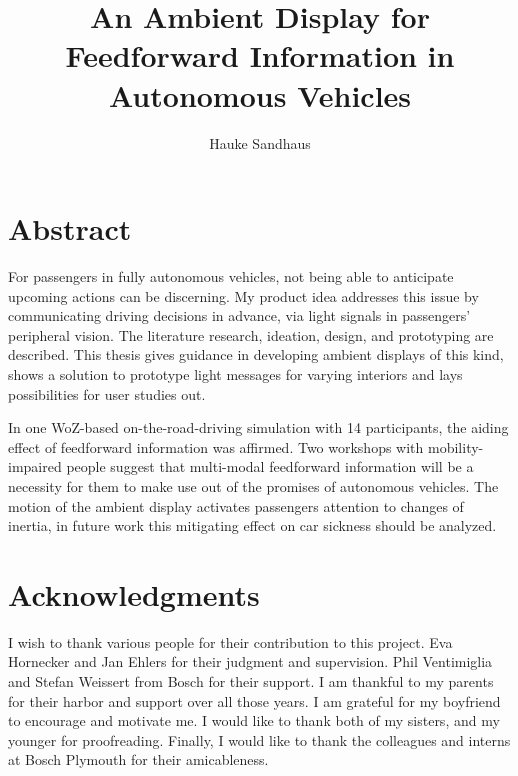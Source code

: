 \documentclass[oneside]{tutthesis} %
\author{Hauke Sandhaus}
\title{An Ambient Display for Feedforward Information in Autonomous Vehicles}
\begin{document}



\chapter*{Abstract}
\label{ch:abstract}
For passengers in fully autonomous vehicles, not being able to anticipate upcoming actions can be discerning. My product idea addresses this issue by communicating driving decisions in advance, via light signals in passengers' peripheral vision. 
The literature research, ideation, design, and prototyping are described. This thesis gives guidance in developing ambient displays of this kind, shows a solution to prototype light messages for varying interiors and lays possibilities for user studies out. 

In one WoZ-based on-the-road-driving simulation with 14 participants, the aiding effect of feedforward information was affirmed. Two workshops with mobility-impaired people suggest that multi-modal feedforward information will be a necessity for them to make use out of the promises of autonomous vehicles. The motion of the ambient display activates passengers attention to changes of inertia, in future work this mitigating effect on car sickness should be analyzed. 





\chapter*{Acknowledgments}
\label{ch:Acknowledgments}
I wish to thank various people for their contribution to this project. Eva Hornecker and Jan Ehlers for their judgment and supervision. Phil Ventimiglia and Stefan Weissert from Bosch for their support. I am thankful to my parents for their harbor and support over all those years. I am grateful for my boyfriend to encourage and motivate me. I would like to thank both of my sisters, and my younger for proofreading. Finally, I would like to thank the colleagues and interns at Bosch Plymouth for their amicableness. 
\end{document}
